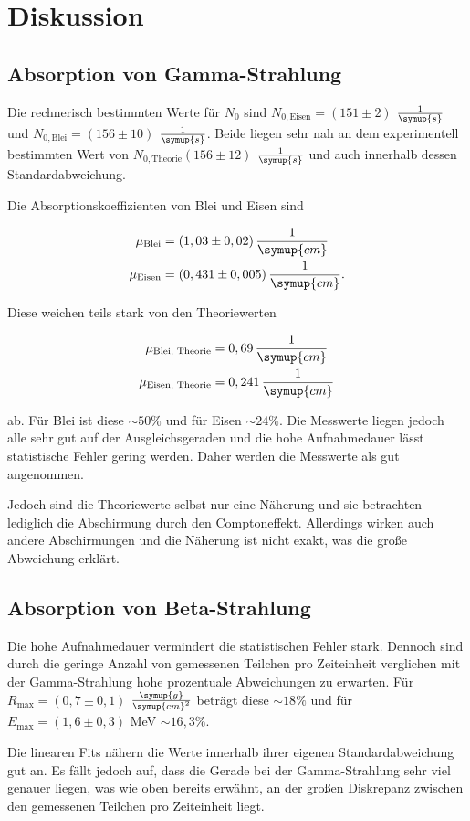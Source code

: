 \section{Diskussion}
\label{sec:Diskussion}

\subsection{Absorption von Gamma-Strahlung}

Die rechnerisch bestimmten Werte für $N_0$ sind $N_{0,\text{Eisen}} = (151 \pm 2)$ $\frac{1}{\symup{s}}$ und $N_{0,\text{Blei}} = (156 \pm 10)$ $\frac{1}{\symup{s}}$. 
Beide liegen sehr nah an dem experimentell bestimmten Wert von $N_{0,\text{Theorie}} (156 \pm 12)$ $\frac{1}{\symup{s}}$ und auch innerhalb dessen Standardabweichung.

Die Absorptionskoeffizienten von Blei und Eisen sind

\begin{align*}
    \mu_\text{Blei} &= (1,03 \pm 0,02) \, \frac{1}{\symup{cm}}\\
    \mu_\text{Eisen} &= (0,431 \pm 0,005) \, \frac{1}{\symup{cm}}.
\end{align*}

Diese weichen teils stark von den Theoriewerten

\begin{align*}
    \mu_\text{Blei, Theorie} &= 0,69 \, \frac{1}{\symup{cm}}\\
    \mu_\text{Eisen, Theorie} &= 0,241 \, \frac{1}{\symup{cm}}
\end{align*}

ab. Für Blei ist diese $\sim \! 50\%$ und für Eisen $\sim \! 24\%$.
Die Messwerte liegen jedoch alle sehr gut auf der Ausgleichsgeraden und die hohe Aufnahmedauer lässt statistische Fehler gering werden.
Daher werden die Messwerte als gut angenommen.

Jedoch sind die Theoriewerte selbst nur eine Näherung und sie betrachten lediglich die Abschirmung durch den Comptoneffekt.
Allerdings wirken auch andere Abschirmungen und die Näherung ist nicht exakt, was die große Abweichung erklärt.



\subsection{Absorption von Beta-Strahlung}

Die hohe Aufnahmedauer vermindert die statistischen Fehler stark. Dennoch sind durch die geringe Anzahl von gemessenen Teilchen pro Zeiteinheit
verglichen mit der Gamma-Strahlung hohe prozentuale Abweichungen zu erwarten.
Für $R_\text{max} = (0,7 \pm 0,1)$ $\frac{\symup{g}}{\symup{cm}^2}$ beträgt diese $\sim \! 18 \%$ und für $E_\text{max} = (1,6 \pm 0,3)$ MeV $\sim \! 16,3 \%$.

Die linearen Fits nähern die Werte innerhalb ihrer eigenen Standardabweichung gut an. Es fällt jedoch auf, dass die Gerade bei der Gamma-Strahlung sehr viel genauer liegen,
was wie oben bereits erwähnt, an der großen Diskrepanz zwischen den gemessenen Teilchen pro Zeiteinheit liegt.